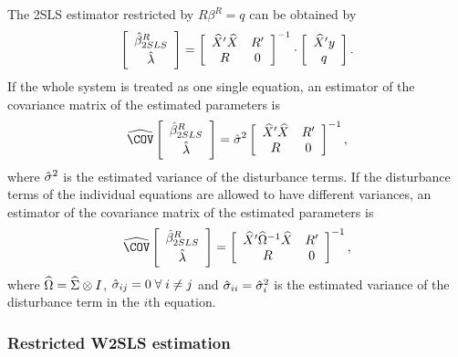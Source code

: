 The 2SLS estimator restricted by $R \beta^R = q$ can be obtained by
\begin{equation}
   \left[ \begin{array}{c}
      \hat{\beta}^R_{2SLS} \\[0.2em] \hat{\lambda}
   \end{array} \right]
   =
   \left[ \begin{array}{cc}
      \widehat{X}' \widehat{X} & R' \\
      R & 0
   \end{array} \right]^{-1}
   \cdot
   \left[ \begin{array}{c}
      \widehat{X}' y \\ q
   \end{array} \right] .
   \label{eq:beta2SLSr}
\end{equation}
If the whole system is treated as one single equation,
an estimator of the covariance matrix of the estimated parameters is
\begin{equation}
   \COVHat
   \left[ \begin{array}{c}
      \bHat^R_{2SLS} \\[0.2em] \lHat
   \end{array} \right] 
   = \sHat^2 
   \left[ \begin{array}{cc}
      \XHat' \XHat & R' \\
      R & 0
   \end{array} \right]^{-1} ,
\end{equation}
where $\hat{\sigma}^2$ is the estimated variance of the disturbance terms.
If the disturbance terms of the individual equations
are allowed to have different variances, 
an estimator of the covariance matrix of the estimated parameters is
\begin{equation}
   \COVHat
   \left[ \begin{array}{c}
      \bHat^R_{2SLS} \\[0.2em] \lHat
   \end{array} \right] 
   = 
   \left[ \begin{array}{cc}
      \XHat' \OHat^{-1} \XHat & R' \\
      R & 0
   \end{array} \right]^{-1} ,
\end{equation}
where $\widehat{\Omega} = \widehat{\Sigma} \otimes I$,
$\hat{\sigma}_{ij} = 0 \; \forall \; i \neq j$ and
$\hat{\sigma}_{ii} = \hat{\sigma}_i^2$ is the estimated variance
of the disturbance term in the $i$th equation.


\subsubsection{Restricted W2SLS estimation}

